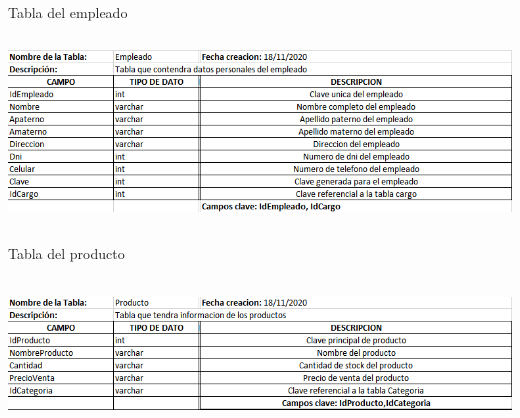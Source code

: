 \documentclass[12pt,letterpaper]{article}
\begin{document}
Tabla del empleado
\begin{center}
    \includegraphics[width=14cm, height=5cm]{img/empleado.png}  
\end{center}
\newpage
Tabla del producto
\begin{center}
    \includegraphics[width=14cm, height=4cm]{img/producto.png}  
\end{center}
\end{document}
